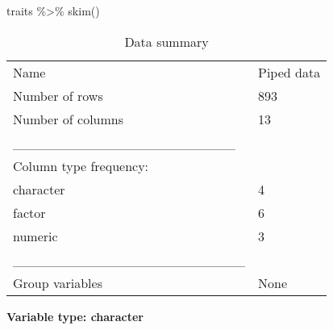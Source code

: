 \documentclass[
  letterpaper,
  DIV=11,
  numbers=noendperiod]{scrreprt}
\newenvironment{Shaded}{\begin{snugshade}}{\end{snugshade}}
\newcommand{\FunctionTok}[1]{\textcolor[rgb]{0.28,0.35,0.67}{#1}}
\newcommand{\NormalTok}[1]{\textcolor[rgb]{0.00,0.23,0.31}{#1}}
\newcommand{\SpecialCharTok}[1]{\textcolor[rgb]{0.37,0.37,0.37}{#1}}
\begin{document}
\begin{Shaded}
\begin{Highlighting}[]
\NormalTok{traits }\SpecialCharTok{\%\textgreater{}\%}
  \FunctionTok{skim}\NormalTok{()}
\end{Highlighting}
\end{Shaded}

\begin{longtable}[]{@{}ll@{}}
\caption{Data summary}\tabularnewline
\toprule\noalign{}
\endfirsthead
\endhead
\bottomrule\noalign{}
\endlastfoot
Name & Piped data \\
Number of rows & 893 \\
Number of columns & 13 \\
\_\_\_\_\_\_\_\_\_\_\_\_\_\_\_\_\_\_\_\_\_\_\_ & \\
Column type frequency: & \\
character & 4 \\
factor & 6 \\
numeric & 3 \\
\_\_\_\_\_\_\_\_\_\_\_\_\_\_\_\_\_\_\_\_\_\_\_\_ & \\
Group variables & None \\
\end{longtable}

\textbf{Variable type: character}
\end{document}
